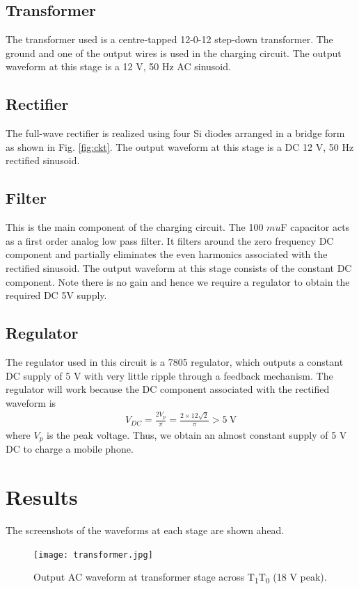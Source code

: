 \documentclass[journal,12pt,twocolumn]{IEEEtran}
\begin{document}
	\subsection{Transformer}
	The transformer used is a centre-tapped 12-0-12 step-down 
	transformer. The ground and one of the output wires is used
	in the charging circuit. The output waveform at this stage is
	a 12 V, 50 Hz AC sinusoid.
	
	\subsection{Rectifier}
	The full-wave rectifier is realized using four Si diodes arranged in a
	bridge form as shown in Fig. \ref{fig:ckt}. The output waveform at this
	stage is a DC 12 V, 50 Hz rectified sinusoid.
	
	\subsection{Filter}
	This is the main component of the charging circuit. The 100 $mu$F
	capacitor acts as a first order analog low pass filter. It filters
	around the zero frequency DC component and partially eliminates the
	even harmonics associated with the rectified sinusoid. The output 
	waveform at this stage consists of the constant DC component. Note
	there is no gain and hence we require a regulator to obtain the
	required DC 5V supply.
	
	\subsection{Regulator}
	The regulator used in this circuit is a 7805 regulator, which outputs
	a constant DC supply of 5 V with very little ripple through a 
	feedback mechanism. The regulator will work because the DC component 
	associated with the rectified waveform is
	\begin{align}
		V_{DC} = \frac{2V_p}{\pi} = \frac{2\times12\sqrt{2}}{\pi} > \SI{5}{\V}
	\end{align}
	where $V_p$ is the peak voltage. Thus, we obtain an almost
	constant supply of 5 V DC to charge a mobile phone.
	
	\section{Results}
	The screenshots of the waveforms at each stage are shown ahead.
	
	\begin{figure}[!ht]
		\texttt{[image: transformer.jpg]}
		\caption{Output AC waveform at transformer stage across T\textsubscript{1}T\textsubscript{0} (18 V peak).}
		\label{fig:transformer}
	\end{figure}
	
\end{document}
